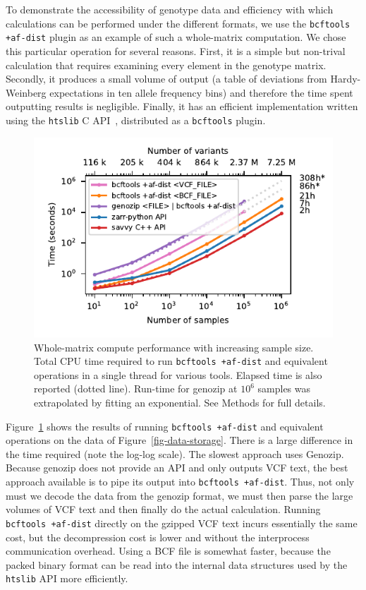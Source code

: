\documentclass[a4paper,num-refs]{oup-contemporary}
\begin{document}
To demonstrate the accessibility of genotype data and efficiency with 
which calculations can be performed under the different formats,
we use the \texttt{bcftools +af-dist} plugin as an example of such a whole-matrix
computation. 
We chose this particular operation for several
reasons. First, it is a simple but non-trival calculation that requires 
examining every element in the genotype matrix.
Secondly, it produces a small volume of output (a table of
deviations from Hardy-Weinberg expectations in ten allele frequency
bins) and therefore the time spent outputting results is negligible.
Finally, it has an efficient implementation written using the 
\texttt{htslib} C API~\citep{bonfield2021htslib}, distributed as 
a \texttt{bcftools} plugin. 

\begin{figure}
\includegraphics{figures/whole-matrix-compute}
\caption{Whole-matrix compute performance with increasing sample size.
Total CPU time required to run \texttt{bcftools +af-dist}
and equivalent operations in a single thread for various tools.
Elapsed time is also reported (dotted line). Run-time for genozip
at $10^6$ samples was extrapolated by fitting an exponential.
See Methods for full details.
\label{fig-whole-matrix-compute}}
\end{figure}

Figure~\ref{fig-whole-matrix-compute} shows the results of 
running \texttt{bcftools +af-dist} and equivalent operations 
on the data of Figure~\ref{fig-data-storage}. There is a large
difference in the time required (note the log-log scale). 
The slowest approach uses Genozip. Because genozip does not
provide an API and only outputs VCF text, the best approach available 
is to pipe its output into \texttt{bcftools +af-dist}. Thus,
not only must we decode the data from the genozip format, we must 
then parse the large volumes of VCF text and then finally do the 
actual calculation. Running \texttt{bcftools +af-dist} directly
on the gzipped VCF text incurs essentially the same cost, but
the decompression cost is lower and without the interprocess 
communication overhead. Using a BCF file is somewhat faster,
because the packed binary format can be read into the internal 
data structures used by the \texttt{htslib} API more efficiently.
\end{document}
